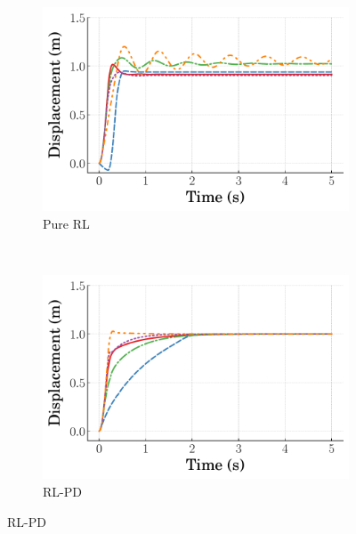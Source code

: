 %
\begin{figure}[tb]
    \centering
    \begin{subfigure}[b]{0.49\textwidth}
        \centering
        \includegraphics[width=\textwidth]{figures/figures_RL_model_based_control/time_responses_duffing/duffing_pure_RL/Displacement_1_init_10000_steps.pdf}
        \caption{Pure RL}
        \label{subfig_chap2:duffing_pure_RL_10000_steps}
    \end{subfigure}\\
    \hfill
    \begin{subfigure}[b]{0.49\textwidth}
        \centering
        \includegraphics[width=\textwidth]{figures/figures_RL_model_based_control/time_responses_duffing/duffing_RL_PD/Displacement_1_init_10000_steps.pdf}
        \caption{RL-PD}
        \label{subfig_chap2:duffing_RL_PD_10000_steps}
    \end{subfigure}

\end{figure}
